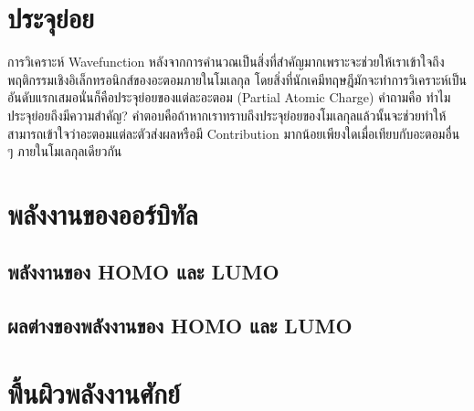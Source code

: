 \section{ประจุย่อย}
\label{sec:partial_charge}

การวิเคราะห์ Wavefunction หลังจากการคำนวณเป็นสิ่งที่สำคัญมากเพราะจะช่วยให้เราเข้าใจถึงพฤติกรรมเชิงอิเล็กทรอนิกส์ของอะตอมภายในโมเลกุล 
โดยสิ่งที่นักเคมีทฤษฎีมักจะทำการวิเคราะห์เป็นอันดับแรกเสมอนั่นก็คือประจุย่อยของแต่ละอะตอม (Partial Atomic Charge) คำถามคือ 
ทำไมประจุย่อยถึงมีความสำคัญ? คำตอบคือถ้าหากเราทราบถึงประจุย่อยของโมเลกุลแล้วนั้นจะช่วยทำให้สามารถเข้าใจว่าอะตอมแต่ละตัวส่งผลหรือมี 
Contribution มากน้อยเพียงใดเมื่อเทียบกับอะตอมอื่น ๆ ภายในโมเลกุลเดียวกัน

\section{พลังงานของออร์บิทัล}
\label{sec:ener_orb}



\subsection{พลังงานของ HOMO และ LUMO}
\label{ssec:ener_homo_lumo}



\subsection{ผลต่างของพลังงานของ HOMO และ LUMO}
\label{sec:ener_diff_orb}


\section{พื้นผิวพลังงานศักย์}
\label{sec:pef}

